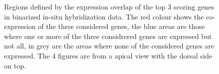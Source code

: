 \begin{figure}[bth]
        \caption{Regions defined by the expression overlap of the top 3 scoring genes in \cite{Tomer10} binarized in-situ hybridization data. The red colour shows the co-expression of the three considered genes, the blue areas are those where one or more of the three considrered genes are expressed but not all, in grey are the areas where none of the considered genes are expressed. The 4 figures are from a apical view with the dorsal side on top.}\label{fig:cell_localization}
\end{figure}


	
	



